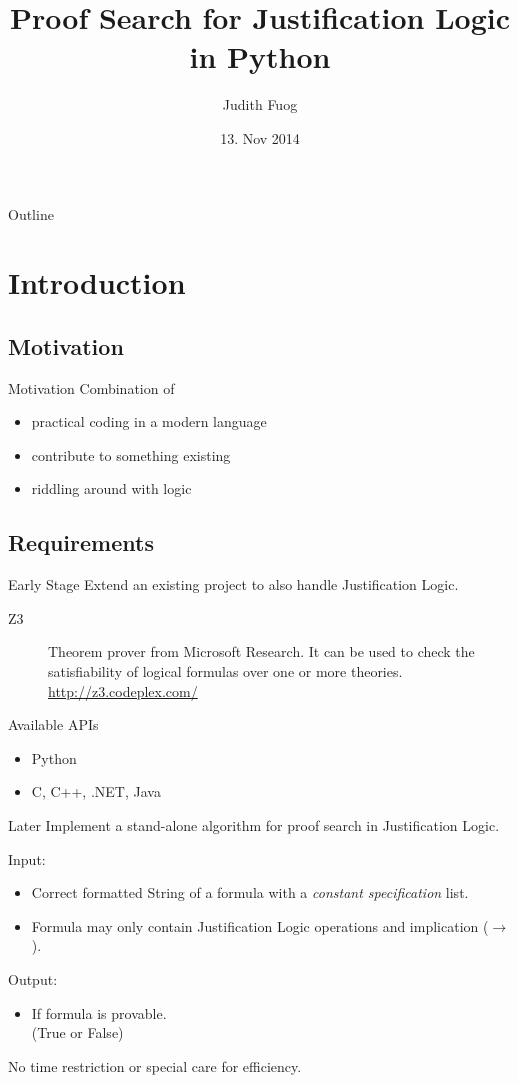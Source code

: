 \documentclass{beamer}
\title[j-logic]{Proof Search for Justification Logic in Python}
\author{Judith Fuog}
\institute{Universität Bern, Informatik}
\date{13. Nov 2014}
\begin{document}
\begin{frame}
  \titlepage
\end{frame}

\begin{frame}{Outline}
  \tableofcontents
\end{frame}

\section{Introduction}
\subsection{Motivation}
\begin{frame}{Motivation}
	Combination of
	\begin{itemize}
		\item practical coding in a modern language
		\item contribute to something existing
		\item riddling around with logic
	\end{itemize}
\end{frame}

\subsection{Requirements}
\begin{frame}{Early Stage}
	Extend an existing project to also handle Justification Logic.
	\begin{description}
	\item[Z3]Theorem prover from Microsoft Research. It can be used to check the satisfiability of logical formulas over one or more theories.\\
	\url{http://z3.codeplex.com/}
	\end{description}
	Available APIs
	\begin{itemize}
	\item Python
	\item C, C++, .NET, Java
	\end{itemize}
\end{frame}

\begin{frame}{Later}
	Implement a stand-alone algorithm for proof search in Justification Logic.

	Input:		
		\begin{itemize}
			\item Correct formatted String of a formula with a \emph{constant specification} list.
			\item Formula may only contain Justification Logic operations and implication ($\to$).
		\end{itemize}
		
	Output:
		\begin{itemize}
			\item If formula is provable.\\
			(True or False)
		\end{itemize}
	No time restriction or special care for efficiency.
\end{frame}
\end{document}
